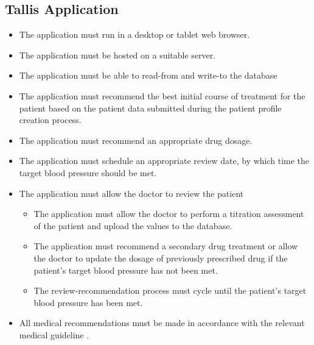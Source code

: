 \documentclass[11pt]{article}
\begin{document}
\subsection{Tallis Application}
\begin{itemize}
\item The application must run in a desktop or tablet web browser.
\item The application must be hosted on a suitable server.
\item The application must be able to read-from and write-to the database
\item The application must recommend the best initial course of treatment for the patient based on the patient data submitted during the patient profile creation process.
\item The application must recommend an appropriate drug dosage.
\item The application must schedule an appropriate review date, by which time the target blood pressure should be met.
\item The application must allow the doctor to review the patient
	\begin{itemize}
    \item The application must allow the doctor to perform a titration assessment of the patient and upload the values to the database.
    \item The application must recommend a secondary drug treatment or allow the doctor to update the dosage of previously prescribed drug if the patient's target blood pressure has not been met.
    \item The review-recommendation process must cycle until the patient's target blood pressure has been met.
    \end{itemize}
\item All medical recommendations must be made in accordance with the relevant medical guideline \cite{CG127}.
\end{itemize}
\end{document}
